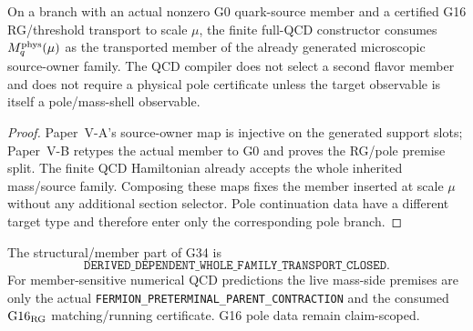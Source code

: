 \documentclass[12pt,a4paper]{article}
\begin{document}
\begin{theorem}
\label{p10:thm:v164-no-independent-qmass-constructor}
On a branch with an actual nonzero G0 quark-source member and a certified G16
RG/threshold transport to scale \(\mu\), the finite full-QCD constructor
consumes \(M_q^{\rm phys}(\mu)\) as the transported member of the already
generated microscopic source-owner family.  The QCD compiler does not select a
second flavor member and does not require a physical pole certificate unless
the target observable is itself a pole/mass-shell observable.
\end{theorem}
\begin{proof}
Paper~V-A's source-owner map is injective on the generated support slots;
Paper~V-B retypes the actual member to G0 and proves the RG/pole premise split.
The finite QCD Hamiltonian already accepts the whole inherited mass/source
family.  Composing these maps fixes the member inserted at scale \(\mu\)
without any additional section selector.  Pole continuation data have a
different target type and therefore enter only the corresponding pole branch.
\end{proof}

\begin{corollary}
\label{p10:cor:v164-g34-transitive-status}
The structural/member part of G34 is
\[
 \boxed{\texttt{DERIVED\_DEPENDENT\_WHOLE\_FAMILY\_TRANSPORT\_CLOSED}}.
\]
For member-sensitive numerical QCD predictions the live mass-side premises are
only the actual \texttt{FERMION\_PRETERMINAL\_PARENT\_CONTRACTION} and the consumed
\(\mathrm{G16}_{\rm RG}\) matching/running certificate.  G16 pole data remain
claim-scoped.
\end{corollary}


\end{document}
